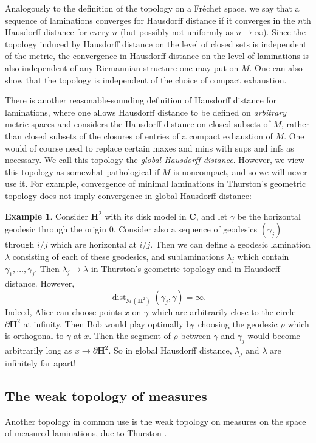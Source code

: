 \documentclass[reqno,10pt]{amsart}
\newcommand{\CC}{\mathbf{C}}
\newcommand{\Hyp}{\mathbf H}
\DeclareMathOperator{\dist}{dist}
\newcommand{\dfn}[1]{\emph{#1}\index{#1}}
\theoremstyle{definition}
\newtheorem{example}[theorem]{Example}
\numberwithin{equation}{section}
\begin{document}
Analogously to the definition of the topology on a Fr\'echet space, we say that a sequence of laminations converges for Hausdorff distance if it converges in the $n$th Hausdorff distance for every $n$ (but possibly not uniformly as $n \to \infty$).
Since the topology induced by Hausdorff distance on the level of closed sets is independent of the metric, the convergence in Hausdorff distance on the level of laminations is also independent of any Riemannian structure one may put on $M$.
One can also show that the topology is independent of the choice of compact exhaustion.

There is another reasonable-sounding definition of Hausdorff distance for laminations, where one allows Hausdorff distance to be defined on \emph{arbitrary} metric spaces and considers the Hausdorff distance on closed subsets of $M$, rather than closed subsets of the closures of entries of a compact exhaustion of $M$.
One would of course need to replace certain maxes and mins with sups and infs as necessary.
We call this topology the \dfn{global Hausdorff distance}.
However, we view this topology as somewhat pathological if $M$ is noncompact, and so we will never use it.
For example, convergence of minimal laminations in Thurston's geometric topology does not imply convergence in global Hausdorff distance:

\begin{example}
Consider $\Hyp^2$ with its disk model in $\CC$, and let $\gamma$ be the horizontal geodesic through the origin $0$.
Consider also a sequence of geodesics $(\gamma_j)$ through $i/j$ which are horizontal at $i/j$.
Then we can define a geodesic lamination $\lambda$ consisting of each of these geodesics, and sublaminations $\lambda_j$ which contain $\gamma_1, \dots, \gamma_j$.
Then $\lambda_j \to \lambda$ in Thurston's geometric topology and in Hausdorff distance.
However,
$$\dist_{\mathscr H(\Hyp^2)}(\gamma_j, \gamma) = \infty.$$
Indeed, Alice can choose points $x$ on $\gamma$ which are arbitrarily close to the circle $\partial \Hyp^2$ at infinity.
Then Bob would play optimally by choosing the geodesic $\rho$ which is orthogonal to $\gamma$ at $x$.
Then the segment of $\rho$ between $\gamma$ and $\gamma_j$ would become arbitrarily long as $x \to \partial \Hyp^2$.
So in global Hausdorff distance, $\lambda_j$ and $\lambda$ are infinitely far apart!
\end{example}


\subsection{The weak topology of measures}
Another topology in common use is the weak topology on measures on the space of measured laminations, due to Thurston \cite[Chapter 8]{thurston1998minimal}.
\end{document}
